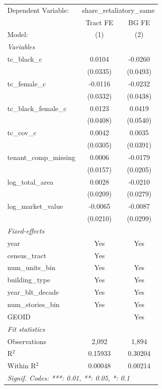 \par\endgroup
\begingroup
\centering
\begin{tabular}{lcc}
   \tabularnewline \midrule \midrule
   Dependent Variable: & \multicolumn{2}{c}{share\_retaliatory\_same}\\
                           & Tract FE & BG FE \\   
   Model:                  & (1)      & (2)\\  
   \midrule
   \emph{Variables}\\
   tc\_black\_c            & 0.0104   & -0.0260\\   
                           & (0.0335) & (0.0493)\\   
   tc\_female\_c           & -0.0116  & -0.0232\\   
                           & (0.0332) & (0.0438)\\   
   tc\_black\_female\_c    & 0.0123   & 0.0419\\   
                           & (0.0408) & (0.0540)\\   
   tc\_cov\_c              & 0.0042   & 0.0035\\   
                           & (0.0305) & (0.0391)\\   
   tenant\_comp\_missing   & 0.0006   & -0.0179\\   
                           & (0.0157) & (0.0205)\\   
   log\_total\_area        & 0.0028   & -0.0210\\   
                           & (0.0209) & (0.0279)\\   
   log\_market\_value      & -0.0065  & -0.0087\\   
                           & (0.0210) & (0.0299)\\   
   \midrule
   \emph{Fixed-effects}\\
   year                    & Yes      & Yes\\  
   census\_tract           & Yes      & \\  
   num\_units\_bin         & Yes      & Yes\\  
   building\_type          & Yes      & Yes\\  
   year\_blt\_decade       & Yes      & Yes\\  
   num\_stories\_bin       & Yes      & Yes\\  
   GEOID                   &          & Yes\\  
   \midrule
   \emph{Fit statistics}\\
   Observations            & 2,092    & 1,894\\  
   R$^2$                   & 0.15933  & 0.30204\\  
   Within R$^2$            & 0.00048  & 0.00214\\  
   \midrule \midrule
   \multicolumn{3}{l}{\emph{Signif. Codes: ***: 0.01, **: 0.05, *: 0.1}}\\
\end{tabular}

